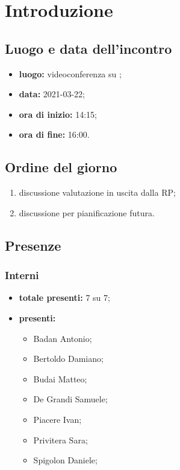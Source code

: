 \section*{Introduzione}
\subsection*{Luogo e data dell'incontro}
\begin{itemize}
	\item \textbf{luogo:} videoconferenza su ;
	\item \textbf{data:} 2021-03-22;
	\item \textbf{ora di inizio:} 14:15;
	\item \textbf{ora di fine:} 16:00.
\end{itemize}

\subsection*{Ordine del giorno}
\begin{enumerate}
	\item discussione valutazione in uscita dalla RP;
	\item discussione per pianificazione futura.
		
\end{enumerate}

\subsection*{Presenze}
\subsubsection*{Interni}
\begin{itemize}
	\item \textbf{totale presenti:} 7 su 7;
	\item \textbf{presenti: }
	\begin{itemize}
		\item Badan Antonio;
		\item Bertoldo Damiano;
		\item Budai Matteo;
		\item De Grandi Samuele;
		\item Piacere Ivan;
		\item Privitera Sara;
		\item Spigolon Daniele;
	\end{itemize}
\end{itemize}


